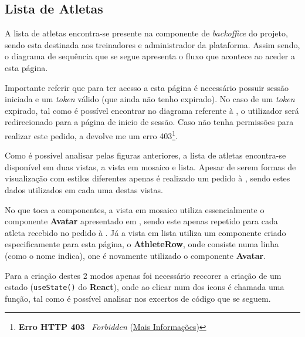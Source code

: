 \subsection{Lista de Atletas}
\label{athletesSequenceDiagram}

A lista de atletas encontra-se presente na componente de \textit{backoffice} do projeto, sendo esta destinada aos treinadores e administrador da plataforma. Assim sendo, o diagrama de sequência que se segue apresenta o fluxo que acontece ao aceder a esta página.


Importante referir que para ter acesso a esta página é necessário possuir sessão iniciada e um \textit{token} válido (que ainda não tenho expirado). No caso de um \textit{token} expirado, tal como é possível encontrar no diagrama referente à , o utilizador será redirecionado para a página de inicio de sessão. Caso não tenha permissões para realizar este pedido, a \textbf{} devolve me um erro 403\footnote{\textbf{Erro HTTP 403 \textemdash} ~\textit{Forbidden} (\href{https://developer.mozilla.org/pt-BR/docs/Web/HTTP/Status/403}{Mais Informações})}.



Como é possível analisar pelas figuras anteriores, a lista de atletas encontra-se disponível em duas vistas, a vista em mosaico e lista. Apesar de serem formas de visualização com estilos diferentes apenas é realizado um pedido à \textbf{}, sendo estes dados utilizados em cada uma destas vistas.

No que toca a componentes, a vista em mosaico utiliza essencialmente o componente \textbf{Avatar} apresentado em , sendo este apenas repetido para cada atleta recebido no pedido à \textbf{}. Já a vista em lista utiliza um componente criado especificamente para esta página, o \textbf{AthleteRow}, onde consiste numa linha (como o nome indica), one é novamente utilizado o componente \textbf{Avatar}.

Para a criação destes 2 modos apenas foi necessário reccorer a criação de um estado (\texttt{useState()} do \textbf{React}), onde ao clicar num dos icons é chamada uma função, tal como é possível analisar nos excertos de código que se seguem.

